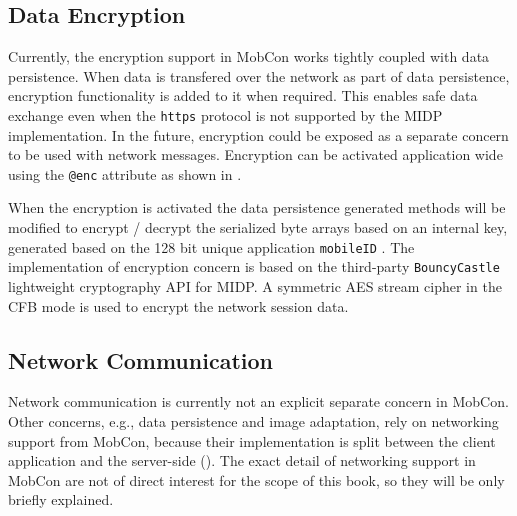 \subsection{Data Encryption}

Currently, the encryption support in MobCon works tightly coupled with data persistence. When data is transfered over the network as part of data persistence, encryption functionality is added to it when required. This enables safe data exchange even when the \texttt{https} protocol is not supported by the MIDP implementation. In the future, encryption could be exposed as a separate concern to be used with network messages. Encryption can be activated application wide using the \texttt{@enc} attribute as shown in .

When the encryption is activated the data persistence generated methods will be modified to encrypt / decrypt the serialized byte arrays based on an internal key, generated based on the 128 bit unique application \texttt{mo\-bi\-le\-ID} . The implementation of encryption concern is based on the third-party {\tt Bouncy\-Castle} \cite{www.bc} lightweight cryptography API for MIDP. A symmetric AES stream cipher in the CFB mode is used to encrypt the network session data.  

\subsection{Network Communication}
\label{sec.mc.net}

Network communication is currently not an explicit separate concern in MobCon. Other concerns, e.g., data persistence and image adaptation, rely on networking support from MobCon, because their implementation is split between the client application and the server-side (). The exact detail of networking support in MobCon are not of direct interest for the scope of this book, so they will be only briefly explained. 

